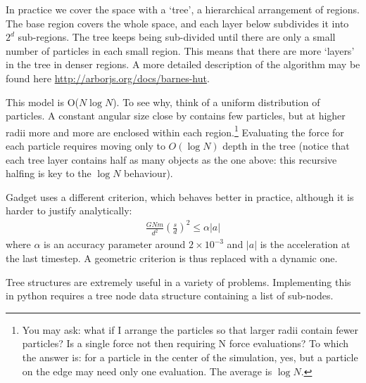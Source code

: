 \documentclass[12pt]{article}
\begin{document}
In practice we cover the space with a `tree', a hierarchical arrangement of regions. The base region covers the whole space, and each layer below subdivides it into $2^d$ sub-regions. The tree keeps being sub-divided until there are only a small number of particles in each small region. This means that there are more `layers' in the tree in denser regions. A more detailed description of the algorithm may be found here \url{http://arborjs.org/docs/barnes-hut}.

This model is O($N \log N$). To see why, think of a uniform distribution of particles. A constant angular size close by contains few particles, but at higher radii more and more are enclosed within each region.\footnote{You may ask: what if I arrange the particles so that larger radii contain fewer particles? Is a single force not then requiring N force evaluations? To which the answer is: for a particle in the center of the simulation, yes, but a particle on the edge may need only one evaluation. The average is $\log N$.} Evaluating the force for each particle requires moving only to $O(\log N)$ depth in the tree (notice that each tree layer contains half as many objects as the one above: this recursive halfing is key to the $\log N$ behaviour).

Gadget uses a different criterion, which behaves better in practice, although it is harder to justify analytically:
\begin{align}
 \frac{G N m}{d^2} \left(\frac{s}{d}\right)^2 \leq \alpha |a|
\end{align}
where $\alpha$ is an accuracy parameter around $2 \times 10^{-3}$ and $|a|$ is the acceleration at the last timestep. A geometric criterion is thus replaced with a dynamic one.

Tree structures are extremely useful in a variety of problems. Implementing this in python requires a tree node data structure containing a list of sub-nodes.
\end{document}
